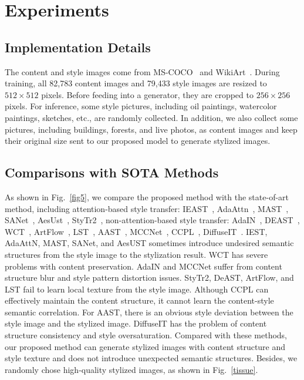 \documentclass[times,twocolumn,final,authoryear]{elsarticle}
\begin{document}
\section{Experiments}
\subsection{Implementation Details}
The content and style images come from MS-COCO~\citep{lin2014microsoft} and WikiArt~\citep{wikiart}. During training, all 82,783 content images and 79,433 style images are resized to $512\times512$ pixels. Before feeding into a generator, they are cropped to $256\times256$ pixels. For inference, some style pictures, including oil paintings, watercolor paintings, sketches, etc., are randomly collected. In addition, we also collect some pictures, including buildings, forests, and live photos, as content images and keep their original size sent to our proposed model to generate stylized images. 
\subsection{Comparisons with SOTA Methods}
As shown in Fig.~\ref{fig5}, we compare the proposed method with the state-of-art method, including attention-based style transfer: IEAST~\citep{chen2021artistic}, AdaAttn~\citep{liu2021adaattn}, MAST~\citep{deng2020arbitrary}, SANet~\citep{park2019arbitrary}, AesUst~\citep{wang2022aesust}, StyTr2~\citep{deng2022stytr2}, non-attention-based style transfer: AdaIN~\citep{huang2017arbitrary}, DEAST~\citep{zhang2022domain}, WCT~\citep{li2017universal}, ArtFlow~\citep{an2021artflow}, LST~\citep{li2019learning}, AAST~\citep{hu2020aesthetic}, MCCNet~\citep{deng2021arbitrary}, CCPL~\citep{wu2022ccpl}, DiffuseIT~\citep{kwon2022diffusion}. IEST, AdaAttN, MAST, SANet, and AesUST sometimes introduce undesired semantic structures from the style image to the stylization result. WCT has severe problems with content preservation. AdaIN and MCCNet suffer from content structure blur and style pattern distortion issues. StyTr2, DeAST, ArtFlow, and LST fail to learn local texture from the style image. Although CCPL can effectively maintain the content structure, it cannot learn the content-style semantic correlation. For AAST, there is an obvious style deviation between the style image and the stylized image. DiffuseIT has the problem of content structure consistency and style oversaturation. Compared with these methods, our proposed method can generate stylized images with content structure and style texture and does not introduce unexpected semantic structures. Besides, we randomly chose high-quality stylized images, as shown in Fig.~\ref{tissue}.
\end{document}

